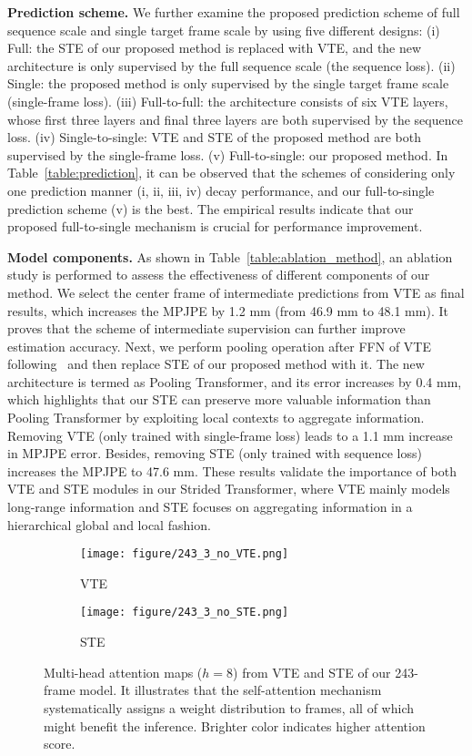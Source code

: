 \documentclass[journal]{IEEEtran}
\begin{document}
\textbf{Prediction scheme.}
We further examine the proposed prediction scheme of full sequence scale and single target frame scale by using five different designs: 
(i) Full: the STE of our proposed method is replaced with VTE, and the new architecture is only supervised by the full sequence scale (the sequence loss). 
(ii) Single: the proposed method is only supervised by the single target frame scale (single-frame loss). 
(iii) Full-to-full: the architecture consists of six VTE layers, whose first three layers and final three layers are both supervised by the sequence loss. 
(iv) Single-to-single: VTE and STE of the proposed method are both supervised by the single-frame loss.
(v) Full-to-single: our proposed method. 
In Table~\ref{table:prediction}, it can be observed that the schemes of considering only one prediction manner (i, ii, iii, iv) decay performance, and our full-to-single prediction scheme (v) is the best. 
The empirical results indicate that our proposed full-to-single mechanism is crucial for performance improvement. 

\textbf{Model components.}
As shown in Table~\ref{table:ablation_method}, an ablation study is performed to assess the effectiveness of different components of our method. 
We select the center frame of intermediate predictions from VTE as final results, which increases the 
MPJPE by 1.2 mm (from 46.9 mm to 48.1 mm). 
It proves that the scheme of intermediate supervision can further improve estimation accuracy. 
Next, we perform pooling operation after FFN of VTE following~\cite{zihang2020funnel-transformer} and then replace STE of our proposed method with it. 
The new architecture is termed as Pooling Transformer, and its error increases by 0.4 mm, which highlights that our STE can preserve more valuable information than Pooling Transformer by exploiting local contexts to aggregate information. 
Removing VTE (only trained with single-frame loss) leads to a 1.1 mm increase in MPJPE error. 
Besides, removing STE (only trained with sequence loss) increases the MPJPE to 47.6 mm. 
These results validate the importance of both VTE and STE modules in our Strided Transformer, where VTE mainly models long-range information and STE focuses on aggregating information in a hierarchical global and local fashion. 

\begin{figure*}[htb]
   \centering
   \begin{subfigure}[htb]{0.497\textwidth}
      \texttt{[image: figure/243\_3\_no\_VTE.png]}
      \caption{VTE}
      \label{fig:attetion_VTE}
   \end{subfigure}
   \begin{subfigure}[htb]{0.497\textwidth}
      \texttt{[image: figure/243\_3\_no\_STE.png]}
      \caption{STE}
      \label{fig:attetion_STE}
   \end{subfigure}
   \caption
   {
      Multi-head attention maps ($h=8$) from VTE and STE of our 243-frame model. 
      It illustrates that the self-attention mechanism systematically assigns a weight distribution to frames, all of which might benefit the inference. 
      Brighter color indicates higher attention score. 
   }
   \label{fig:attention}
\end{figure*}
\end{document}
